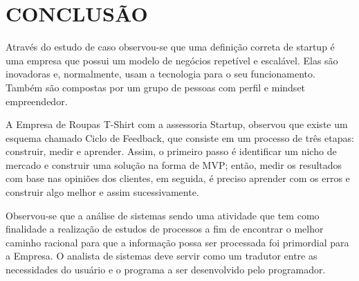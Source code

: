 
\chapter{CONCLUSÃO}
\label{chap:conclusao}

Através do estudo de caso observou-se que uma definição correta de startup é uma empresa que possui um modelo de negócios repetível e escalável. Elas são inovadoras e, normalmente, usam a tecnologia para o seu funcionamento. Também são compostas por um grupo de pessoas com perfil e mindset empreendedor.

A Empresa de Roupas T-Shirt com a assessoria Startup, observou que existe um esquema chamado Ciclo de Feedback, que consiste em um processo de três etapas: construir, medir e aprender.  Assim, o primeiro passo é identificar um nicho de mercado e construir uma solução na forma de MVP; então, medir os resultados com base nas opiniões dos clientes, em seguida, é preciso aprender com os erros e construir algo melhor e assim sucessivamente.

Observou-se que a análise de sistemas sendo uma atividade que tem como finalidade a realização de estudos de processos a fim de encontrar o melhor caminho racional para que a informação possa ser processada foi primordial para a Empresa. O analista de sistemas deve servir como um tradutor entre as necessidades do usuário e o programa a ser desenvolvido pelo programador.
